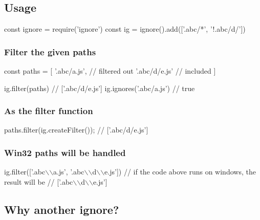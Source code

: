 \subsection*{Usage}


\begin{DoxyCode}
const ignore = require('ignore')
const ig = ignore().add(['.abc/*', '!.abc/d/'])
\end{DoxyCode}


\subsubsection*{Filter the given paths}


\begin{DoxyCode}
const paths = [
  '.abc/a.js',    // filtered out
  '.abc/d/e.js'   // included
]

ig.filter(paths)        // ['.abc/d/e.js']
ig.ignores('.abc/a.js') // true
\end{DoxyCode}


\subsubsection*{As the filter function}


\begin{DoxyCode}
paths.filter(ig.createFilter()); // ['.abc/d/e.js']
\end{DoxyCode}


\subsubsection*{Win32 paths will be handled}


\begin{DoxyCode}
ig.filter(['.abc\(\backslash\)\(\backslash\)a.js', '.abc\(\backslash\)\(\backslash\)d\(\backslash\)\(\backslash\)e.js'])
// if the code above runs on windows, the result will be
// ['.abc\(\backslash\)\(\backslash\)d\(\backslash\)\(\backslash\)e.js']
\end{DoxyCode}


\subsection*{Why another ignore?}


